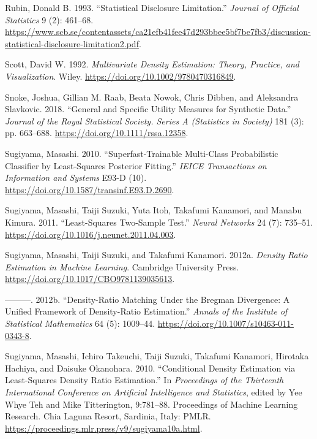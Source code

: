\documentclass[
]{template/style/uneceart}
\newlength{\cslhangindent}
\newlength{\cslentryspacingunit} %
\newenvironment{CSLReferences}[2] %
 {%
  \setlength{\parindent}{0pt}
  \ifodd #1
  \let\oldpar\par
  \def\par{\hangindent=\cslhangindent\oldpar}
  \fi
  \setlength{\parskip}{#2\cslentryspacingunit}
 }%
 {}
\begin{document}
\begin{CSLReferences}{1}{0}
\leavevmode{}%
Rubin, Donald B. 1993. {``Statistical Disclosure Limitation.''}
\emph{Journal of Official Statistics} 9 (2): 461--68.
\url{https://www.scb.se/contentassets/ca21efb41fee47d293bbee5bf7be7fb3/discussion-statistical-disclosure-limitation2.pdf}.

\leavevmode{}%
Scott, David W. 1992. \emph{Multivariate Density Estimation: Theory,
Practice, and Visualization}. Wiley.
\url{https://doi.org/10.1002/9780470316849}.

\leavevmode{}%
Snoke, Joshua, Gillian M. Raab, Beata Nowok, Chris Dibben, and
Aleksandra Slavkovic. 2018. {``General and Specific Utility Measures for
Synthetic Data.''} \emph{Journal of the Royal Statistical Society.
Series A (Statistics in Society)} 181 (3): pp. 663--688.
\url{https://doi.org/10.1111/rssa.12358}.

\leavevmode{}%
Sugiyama, Masashi. 2010. {``Superfast-Trainable Multi-Class
Probabilistic Classifier by Least-Squares Posterior Fitting.''}
\emph{IEICE Transactions on Information and Systems} E93-D (10).
\url{https://doi.org/10.1587/transinf.E93.D.2690}.

\leavevmode{}%
Sugiyama, Masashi, Taiji Suzuki, Yuta Itoh, Takafumi Kanamori, and
Manabu Kimura. 2011. {``Least-Squares Two-Sample Test.''} \emph{Neural
Networks} 24 (7): 735--51.
\url{https://doi.org/10.1016/j.neunet.2011.04.003}.

\leavevmode{}%
Sugiyama, Masashi, Taiji Suzuki, and Takafumi Kanamori. 2012a.
\emph{Density Ratio Estimation in Machine Learning}. Cambridge
University Press. \url{https://doi.org/10.1017/CBO9781139035613}.

\leavevmode{}%
---------. 2012b. {``Density-Ratio Matching Under the Bregman
Divergence: A Unified Framework of Density-Ratio Estimation.''}
\emph{Annals of the Institute of Statistical Mathematics} 64 (5):
1009--44. \url{https://doi.org/10.1007/s10463-011-0343-8}.

\leavevmode{}%
Sugiyama, Masashi, Ichiro Takeuchi, Taiji Suzuki, Takafumi Kanamori,
Hirotaka Hachiya, and Daisuke Okanohara. 2010. {``Conditional Density
Estimation via Least-Squares Density Ratio Estimation.''} In
\emph{Proceedings of the Thirteenth International Conference on
Artificial Intelligence and Statistics}, edited by Yee Whye Teh and Mike
Titterington, 9:781--88. Proceedings of Machine Learning Research. Chia
Laguna Resort, Sardinia, Italy: PMLR.
\url{https://proceedings.mlr.press/v9/sugiyama10a.html}.


\end{CSLReferences}
\end{document}
